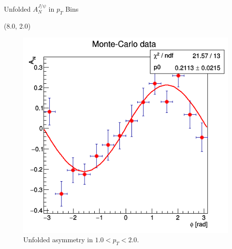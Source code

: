 \documentclass[10pt, xcolor={dvipsnames}, aspectratio = 169]{beamer}
\begin{document}
\begin{frame}{Unfolded $A^{J/\psi}_{N}$ in $p_{T}$ Bins}
\begin{textblock}{7.0}(8.0, 2.0)
\begin{figure}
    \centering
    \includegraphics[width = 1.0\linewidth]{imgs/sigal_asym1.png}
    \caption{Unfolded asymmetry in $1.0 < p_{T} < 2.0$.}
\end{figure}
\end{textblock}

\end{frame}
\end{document}
